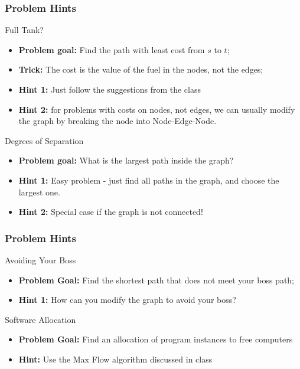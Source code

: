 \begin{frame}
  \frametitle{Problem Hints}
  \begin{block}{Full Tank?}
    \begin{itemize}
    \item {\bf Problem goal:} Find the path with least cost from $s$
      to $t$;
    \item {\bf Trick:} The cost is the value of the fuel in the nodes, not
      the edges;
    \item {\bf Hint 1:} Just follow the suggestions from the class
    \item {\bf Hint 2:} for problems with costs on nodes, not edges, we can
      usually modify the graph by breaking the node into Node-Edge-Node.
    \end{itemize}
  \end{block}
  \begin{exampleblock}{Degrees of Separation}
    \begin{itemize}
    \item {\bf Problem goal:} What is the largest path inside the graph?
    \item {\bf Hint 1:} Easy problem - just find all paths in the
      graph, and choose the largest one.
    \item {\bf Hint 2:} Special case if the graph is not connected!
    \end{itemize}
  \end{exampleblock}
\end{frame}

\begin{frame}
  \frametitle{Problem Hints}
  \begin{block}{Avoiding Your Boss}
    \begin{itemize}
    \item {\bf Problem Goal:} Find the shortest path that does not
      meet your boss path;
    \item {\bf Hint 1:} How can you modify the graph to avoid your
      boss?
    \end{itemize}
  \end{block}

  \begin{exampleblock}{Software Allocation}
    \begin{itemize}
    \item {\bf Problem Goal:} Find an allocation of program instances
      to free computers
    \item {\bf Hint:} Use the Max Flow algorithm discussed in class
    \end{itemize}
  \end{exampleblock}
\end{frame}

